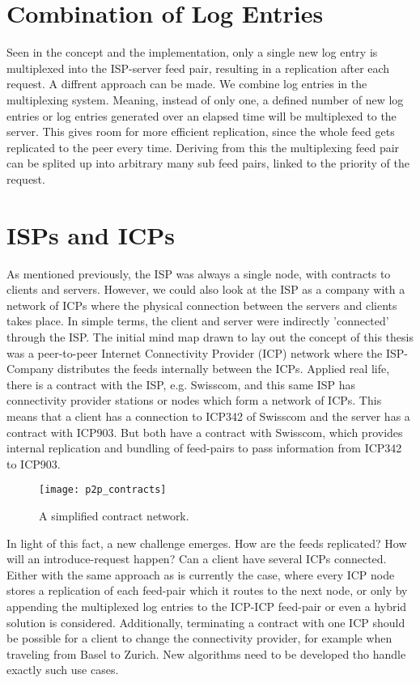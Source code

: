 \section{Combination of Log Entries}
Seen in the concept and the implementation, only a single new log entry is multiplexed into the ISP-server feed pair, resulting in a replication after each request. A diffrent approach can be made. We combine log entries in the multiplexing system. Meaning, instead of only one, a defined number of new log entries or log entries generated over an elapsed time will be multiplexed to the server. This gives room for more efficient replication, since the whole feed gets replicated to the peer every time. Deriving from this the multiplexing feed pair can be splited up into arbitrary many sub feed pairs, linked to the priority of the request. 
\section{ISPs and ICPs}
As mentioned previously, the ISP was always a single node, with contracts to clients and servers. However, we could also look at the ISP as a company with a network of ICPs where the physical connection between the servers and clients takes place. In simple terms, the client and server were indirectly ’connected’ through the ISP. The initial mind map drawn to lay out the concept of this thesis was a peer-to-peer Internet Connectivity Provider (ICP) network where the ISP-Company distributes the feeds internally between the ICPs. Applied real life, there is a contract with the ISP, e.g. Swisscom, and this same ISP has connectivity provider stations or nodes which form a network of ICPs. This means that a client has a connection to ICP342 of Swisscom and the server has a contract with ICP903. But both have a contract with Swisscom, which provides internal replication and bundling of feed-pairs to pass information from ICP342 to ICP903.
\begin{figure}
    \centering
    \texttt{[image: p2p\_contracts]}
    \caption{A simplified contract network.}
    \label{fig:contract_network}
\end{figure}
In light of this fact, a new challenge emerges. How are the feeds replicated? How will an introduce-request happen? Can a client have several ICPs connected. Either with the same approach as is currently the case, where every ICP node stores a replication of each feed-pair which it routes to the next node, or only by appending the multiplexed log entries to the ICP-ICP feed-pair or even a hybrid solution is considered. Additionally, terminating a contract with one ICP should be possible for a client to change the connectivity provider, for example when traveling from Basel to Zurich. New algorithms need to be developed tho handle exactly such use cases.

